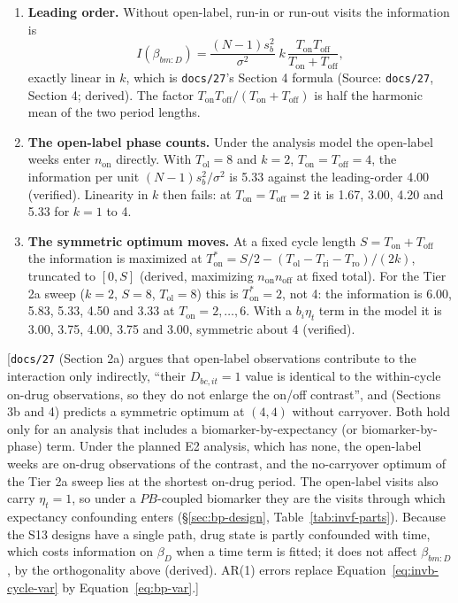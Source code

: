\documentclass[11pt]{article}
\newcommand{\note}[1]{\textcolor{blue!60!black}{\small [#1]}}
\newcommand{\code}[1]{\texttt{#1}}
\begin{document}
\begin{enumerate}[itemsep=2pt]
\item \textbf{Leading order.} Without open-label, run-in or run-out
  visits the information is
  \[
  I(\beta_{bm:D}) = \frac{(N-1)s_b^2}{\sigma^2}\;
    k\,\frac{T_{\mathrm{on}}T_{\mathrm{off}}}
    {T_{\mathrm{on}} + T_{\mathrm{off}}},
  \]
  exactly linear in $k$, which is
  \code{docs/27}'s Section 4 formula (Source: \code{docs/27},
  Section 4; derived). The factor $T_{\mathrm{on}}T_{\mathrm{off}}/
  (T_{\mathrm{on}} + T_{\mathrm{off}})$ is half the harmonic mean of
  the two period lengths.
\item \textbf{The open-label phase counts.} Under the analysis model
  the open-label weeks enter $n_{\mathrm{on}}$ directly. With
  $T_{\mathrm{ol}} = 8$ and $k = 2$, $T_{\mathrm{on}} =
  T_{\mathrm{off}} = 4$, the information per unit $(N-1)s_b^2/\sigma^2$
  is 5.33 against the leading-order 4.00 (verified). Linearity in $k$
  then fails: at $T_{\mathrm{on}} = T_{\mathrm{off}} = 2$ it is 1.67,
  3.00, 4.20 and 5.33 for $k = 1$ to 4.
\item \textbf{The symmetric optimum moves.} At a fixed cycle length
  $S = T_{\mathrm{on}} + T_{\mathrm{off}}$ the information is
  maximized at $T_{\mathrm{on}}^\ast = S/2 - (T_{\mathrm{ol}} -
  T_{\mathrm{ri}} - T_{\mathrm{ro}})/(2k)$, truncated to $[0, S]$
  (derived, maximizing $n_{\mathrm{on}}n_{\mathrm{off}}$ at fixed
  total). For the Tier 2a sweep ($k = 2$, $S = 8$, $T_{\mathrm{ol}} =
  8$) this is $T_{\mathrm{on}}^\ast = 2$, not 4: the information is
  6.00, 5.83, 5.33, 4.50 and 3.33 at $T_{\mathrm{on}} = 2, \ldots, 6$.
  With a $b_i\eta_t$ term in the model it is 3.00, 3.75, 4.00, 3.75 and
  3.00, symmetric about 4 (verified).
\end{enumerate}

\note{\code{docs/27} (Section 2a) argues that open-label observations
contribute to the interaction only indirectly, ``their $D_{bc,it} = 1$
value is identical to the within-cycle on-drug observations, so they
do not enlarge the on/off contrast'', and (Sections 3b and 4) predicts
a symmetric optimum at $(4, 4)$ without carryover. Both hold only for
an analysis that includes a biomarker-by-expectancy (or
biomarker-by-phase) term. Under the planned E2 analysis, which has
none, the open-label weeks are on-drug observations of the contrast,
and the no-carryover optimum of the Tier 2a sweep lies at the
shortest on-drug period. The open-label visits also carry
$\eta_t = 1$, so under a $PB$-coupled biomarker they are the visits
through which expectancy confounding enters (\S\ref{sec:bp-design},
Table~\ref{tab:invf-parts}). Because the S13 designs have a single path,
drug state is partly confounded with time, which costs information on
$\beta_D$ when a time term is fitted; it does not affect
$\beta_{bm:D}$, by the orthogonality above (derived). AR(1) errors
replace Equation~\eqref{eq:invb-cycle-var} by
Equation~\eqref{eq:bp-var}.}
\end{document}
